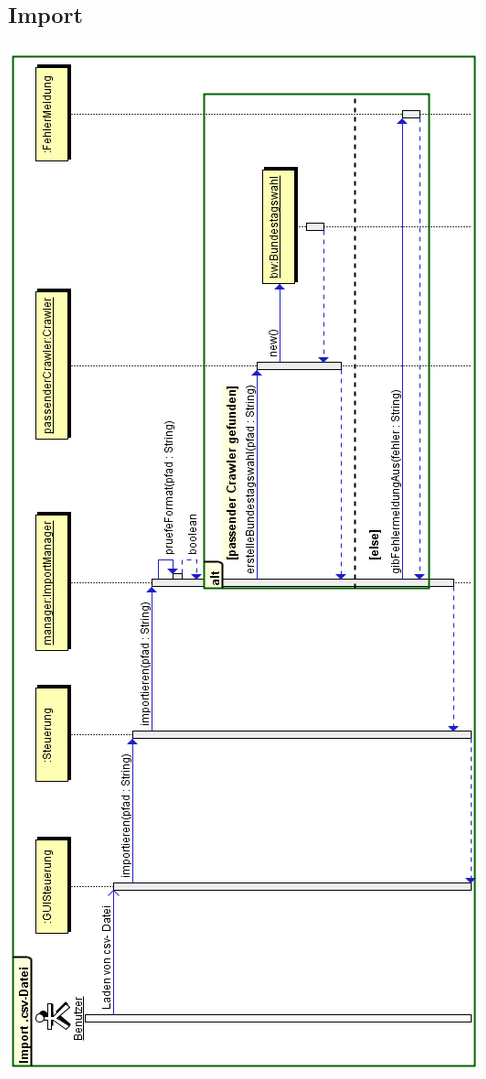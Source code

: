 \documentclass[10pt,a4paper]{article}
\begin{document}
\subsection{Import}
\includegraphics[scale=0.7]{Import-Sequenzdiagramm.png} 
\end{document}
